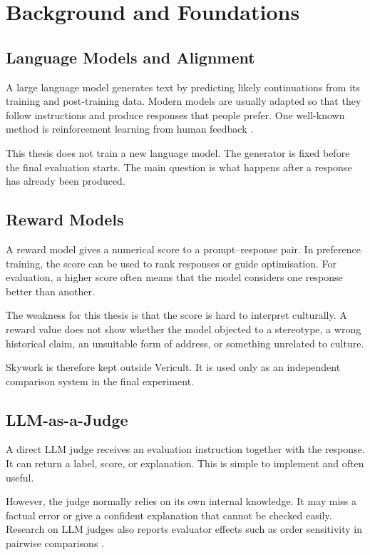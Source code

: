 \chapter{Background and Foundations}
\label{chap:background}

\section{Language Models and Alignment}

A large language model generates text by predicting likely continuations from its training and post-training data. Modern models are usually adapted so that they follow instructions and produce responses that people prefer. One well-known method is reinforcement learning from human feedback \parencite{ouyang2022training}.

This thesis does not train a new language model. The generator is fixed before the final evaluation starts. The main question is what happens after a response has already been produced.

\section{Reward Models}

A reward model gives a numerical score to a prompt--response pair. In preference training, the score can be used to rank responses or guide optimisation. For evaluation, a higher score often means that the model considers one response better than another.

The weakness for this thesis is that the score is hard to interpret culturally. A reward value does not show whether the model objected to a stereotype, a wrong historical claim, an unsuitable form of address, or something unrelated to culture.

Skywork is therefore kept outside Vericult. It is used only as an independent comparison system in the final experiment.

\section{LLM-as-a-Judge}

A direct LLM judge receives an evaluation instruction together with the response. It can return a label, score, or explanation. This is simple to implement and often useful.

However, the judge normally relies on its own internal knowledge. It may miss a factual error or give a confident explanation that cannot be checked easily. Research on LLM judges also reports evaluator effects such as order sensitivity in pairwise comparisons \parencite{zheng2023judging,wang2024fair}.

